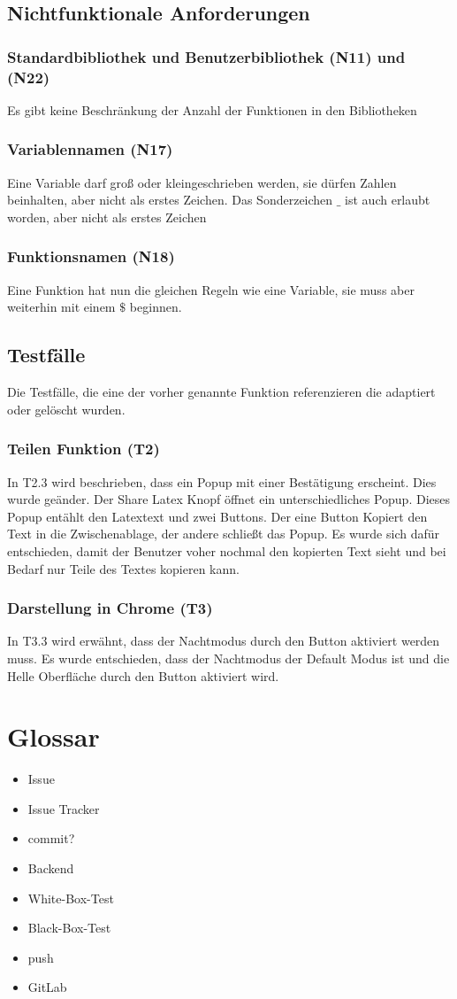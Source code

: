 \documentclass[parskip=full,11pt,twoside]{scrartcl}
\begin{document}
\subsection{Nichtfunktionale Anforderungen}

\subsubsection{Standardbibliothek und Benutzerbibliothek (N11) und (N22)}
	Es gibt keine Beschränkung der Anzahl der Funktionen in den Bibliotheken
\subsubsection{Variablennamen (N17)}
	Eine Variable darf groß oder kleingeschrieben werden, sie dürfen Zahlen
	beinhalten, aber nicht als erstes Zeichen.
	Das Sonderzeichen $\_ $ ist auch erlaubt worden, aber nicht als erstes Zeichen 
\subsubsection{Funktionsnamen (N18)}
	Eine Funktion hat nun die gleichen Regeln wie eine Variable, sie muss aber 
	weiterhin mit einem $\$$ beginnen.
	
\subsection{Testfälle}
	Die Testfälle, die eine der vorher genannte Funktion referenzieren die adaptiert oder
	gelöscht wurden.
\subsubsection{Teilen Funktion (T2)}
	In T2.3 wird beschrieben, dass ein Popup mit einer Bestätigung erscheint.
	Dies wurde geänder.
	Der Share Latex Knopf öffnet ein unterschiedliches Popup.
	Dieses Popup entählt den Latextext und zwei Buttons.
	Der eine Button Kopiert den Text in die Zwischenablage, der andere
	schließt das Popup.
	Es wurde sich dafür entschieden, damit der Benutzer voher nochmal den
	kopierten Text sieht und bei Bedarf nur Teile des Textes kopieren kann.
	
\subsubsection{Darstellung in Chrome (T3)}
	In T3.3 wird erwähnt, dass der Nachtmodus durch den Button aktiviert werden muss.
	Es wurde entschieden, dass der Nachtmodus der Default Modus ist und die Helle
	Oberfläche durch den Button aktiviert wird.
\section{Glossar}
\begin{itemize}
    \item Issue
    \item Issue Tracker
    \item commit?
    \item Backend
    \item White-Box-Test
    \item Black-Box-Test
    \item push
    \item GitLab
\end{itemize}
\end{document}
